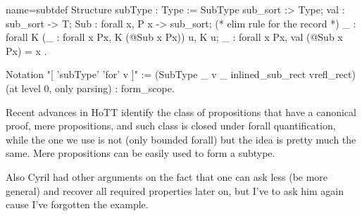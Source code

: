 
\begin{coq}{name=subtdef}{}
Structure subType : Type := SubType {
  sub_sort :> Type;
  val : sub_sort -> T;
  Sub : forall x, P x -> sub_sort;
  (* elim rule for the record *)
  _ : forall K (_ : forall x Px, K (@Sub x Px)) u, K u;
  _ : forall x Px, val (@Sub x Px) = x
}.

Notation "[ 'subType' 'for' v ]" := (SubType _ v _ inlined_sub_rect vrefl_rect)
 (at level 0, only parsing) : form_scope.
\end{coq}


\mcbPROVIDE{}
\mcbREQUIRE{}

Recent advances in HoTT identify the class of propositions that have a
canonical proof, mere propositions, and such class is closed under
forall quantification, while the one we use is not (only bounded
forall) but the idea is pretty much the same.  Mere propositions can
be easily used to form a subtype.

Also Cyril had other arguments on the fact that one can
ask less (be more general) and recover all required properties later
on, but I've to ask him again cause I've forgotten the example.
